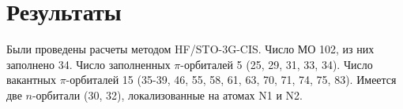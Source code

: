 \section{Результаты}
Были проведены расчеты методом HF/STO-3G-CIS. Число МО 102, из них заполнено 34. Число заполненных $\pi$-орбиталей 5 (25, 29, 31, 33, 34). Число вакантных $\pi$-орбиталей 15 (35-39, 46, 55, 58, 61, 63, 70, 71, 74, 75, 83). Имеется две $n$-орбитали (30, 32), локализованные на атомах N1 и N2.
\begin{table}[H]
    \caption{Сопоставление молекулярных орбиталей, полученных разными методами}
    \begin{center}
    \label{tab:my-table}
    \end{center}{}
\end{table}

